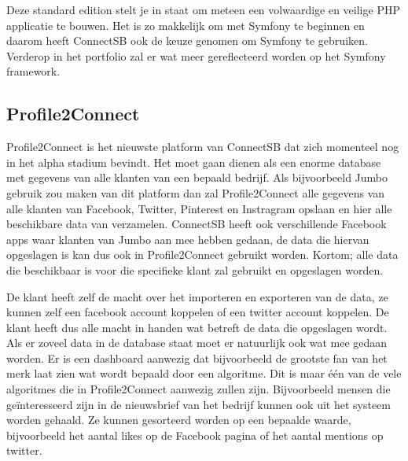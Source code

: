 Deze standard edition stelt je in staat om meteen een volwaardige en veilige PHP applicatie te bouwen. Het is zo makkelijk om met Symfony te beginnen en daarom heeft ConnectSB ook de keuze genomen om Symfony te gebruiken. Verderop in het portfolio zal er wat meer gereflecteerd worden op het Symfony framework.

\subsection{Profile2Connect}
Profile2Connect is het nieuwste platform van ConnectSB dat zich momenteel nog in het alpha stadium bevindt. Het moet gaan dienen als een enorme database met gegevens van alle klanten van een bepaald bedrijf. Als bijvoorbeeld Jumbo gebruik zou maken van dit platform dan zal Profile2Connect alle gegevens van alle klanten van Facebook, Twitter, Pinterest en Instragram opslaan en hier alle beschikbare data van verzamelen. ConnectSB heeft ook verschillende Facebook apps waar klanten van Jumbo aan mee hebben gedaan, de data die hiervan opgeslagen is kan dus ook in Profile2Connect gebruikt worden. Kortom; alle data die beschikbaar is voor die specifieke klant zal gebruikt en opgeslagen worden.

De klant heeft zelf de macht over het importeren en exporteren van de data, ze kunnen zelf een facebook account koppelen of een twitter account koppelen. De klant heeft dus alle macht in handen wat betreft de data die opgeslagen wordt. Als er zoveel data in de database staat moet er natuurlijk ook wat mee gedaan worden. Er is een dashboard aanwezig dat bijvoorbeeld de grootste fan van het merk laat zien wat wordt bepaald door een algoritme. Dit is maar één van de vele algoritmes die in Profile2Connect aanwezig zullen zijn. Bijvoorbeeld mensen die geïnteresseerd zijn in de nieuwsbrief van het bedrijf kunnen ook uit het systeem worden gehaald. Ze kunnen gesorteerd worden op een bepaalde waarde, bijvoorbeeld het aantal likes op de Facebook pagina of het aantal mentions op twitter.


